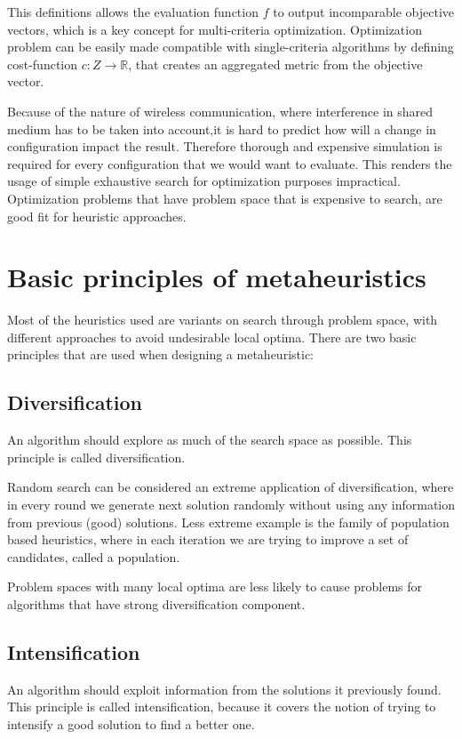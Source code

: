 \documentclass[12pt,oneside]{fithesis2}
\begin{document}
This definitions allows the evaluation function $f$ to output incomparable objective vectors, which is a key concept for multi-criteria optimization. Optimization problem can be easily made compatible with single-criteria algorithms by defining cost-function $c:Z \to \mathbb{R}$, that creates an aggregated metric from the objective vector.

Because of the nature of wireless communication, where interference in shared medium has to be taken into account,it is hard to predict how will a change in configuration impact the result. Therefore thorough and expensive simulation is required for every configuration that we would want to evaluate. This renders the usage of simple exhaustive search for optimization purposes impractical. Optimization problems that have problem space that is expensive to search, are good fit for heuristic approaches\cite{talbi2009metaheuristics}. 

\section{Basic principles of metaheuristics}

Most of the heuristics used are variants on search through problem space, with different approaches to avoid undesirable local optima.
There are two basic principles that are used when designing a metaheuristic\cite{talbi2009metaheuristics}:

\subsection{Diversification}
An algorithm should explore as much of the search space as possible. This principle is called diversification.

Random search can be considered an extreme application of diversification, where in every round we generate next solution randomly without using any information from previous (good) solutions. Less extreme example is the family of population based heuristics, where in each iteration we are trying to improve a set of candidates, called a population.

Problem spaces with many local optima are less likely to cause problems for algorithms that have strong diversification component.

\subsection{Intensification} 
An algorithm should exploit information from the solutions it previously found. This principle is called intensification, because it covers the notion of trying to intensify a good solution to find a better one.
\end{document}
